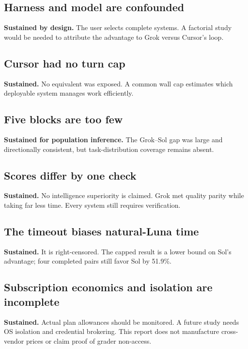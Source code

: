 \documentclass[11pt,oneside]{article}
\begin{document}
\subsection{Harness and model are confounded}

\textbf{Sustained by design.} The user selects complete systems. A factorial
study would be needed to attribute the advantage to Grok versus Cursor's loop.

\subsection{Cursor had no turn cap}

\textbf{Sustained.} No equivalent was exposed. A common wall cap estimates
which deployable system manages work efficiently.

\subsection{Five blocks are too few}

\textbf{Sustained for population inference.} The Grok--Sol gap was large and
directionally consistent, but task-distribution coverage remains absent.

\subsection{Scores differ by one check}

\textbf{Sustained.} No intelligence superiority is claimed. Grok met quality
parity while taking far less time. Every system still requires verification.

\subsection{The timeout biases natural-Luna time}

\textbf{Sustained.} It is right-censored. The capped result is a lower bound on
Sol's advantage; four completed pairs still favor Sol by 51.9\%.

\subsection{Subscription economics and isolation are incomplete}

\textbf{Sustained.} Actual plan allowances should be monitored. A future study
needs OS isolation and credential brokering. This report does not manufacture
cross-vendor prices or claim proof of grader non-access.
\end{document}
